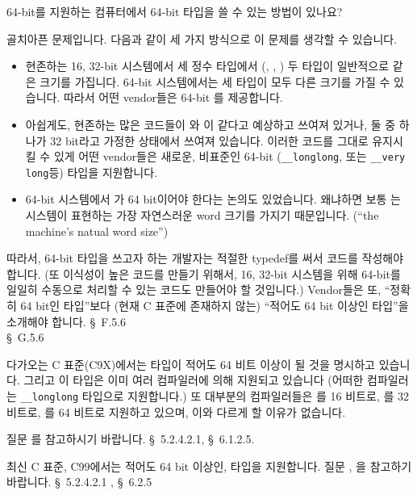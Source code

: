 	
\begin{faq}
	64-bit를 지원하는 컴퓨터에서 64-bit 타입을 쓸 수 있는 방법이 있나요?

\A	
        골치아픈 문제입니다. 다음과 같이 세 가지 방식으로 이 문제를
        생각할 수 있습니다.

        \begin{itemize}
          \item 현존하는 16, 32-bit 시스템에서 세 정수 타입에서
            (, , ) 두 타입이 일반적으로
            같은 크기를 가집니다. 64-bit 시스템에서는 세 타입이 모두
            다른 크기를 가질 수 있습니다. 따라서 어떤 vendor들은
            64-bit 를 제공합니다.

          \item 아쉽게도, 현존하는 많은 코드들이 와 이
            같다고 예상하고 쓰여져 있거나, 둘 중 하나가 32 bit라고 가정한
            상태에서 쓰여져 있습니다. 이러한 코드를 그대로 유지시킬 수
            있게 어떤 vendor들은 새로운, 비표준인 64-bit 
            (\verb+__longlong+, 또는 \verb+__very long+등) 타입을
            지원합니다.

          \item 64-bit 시스템에서 가 64 bit이어야 한다는
            논의도 있었습니다. 왜냐하면 보통 는 시스템이
            표현하는 가장 자연스러운 word 크기를 가지기 때문입니다.
            (``the machine's natual word size'')
        \end{itemize}

        따라서, 64-bit 타입을 쓰고자 하는 개발자는 적절한 typedef를 써서
        코드를 작성해야 합니다. (또 이식성이 높은 코드를 만들기 위해서,
        16, 32-bit 시스템을 위해 64-bit를 일일히 수동으로 처리할 수 있는
        코드도 만들어야 할 것입니다.)  Vendor들은 또, ``정확히 64 bit인
        타입''보다 (현재 C 표준에 존재하지 않는) 
        ``적어도 64 bit 이상인 타입''을 소개해야 합니다.
\T
	\cite{ansi} \S\ F.5.6 \\
        \cite{c89} \S\ G.5.6

\A
	다가오는 C 표준(C9X)에서는  타입이 적어도 64 비트
	이상이 될 것을 명시하고 있습니다.  그리고 이 타입은 이미 여러 
	컴파일러에 의해 지원되고 있습니다 (어떠한 컴파일러는 
	\verb+__longlong+ 타입으로 지원합니다.) 
	또 대부분의 컴파일러들은 를 16 비트로,
	를 32 비트로, 를 64 비트로 지원하고 있으며,
	이와 다르게 할 이유가 없습니다.

	질문 를 참고하시기 바랍니다.
\R 
	\cite{c9x} \S\ 5.2.4.2.1, \S\ 6.1.2.5.

\T
	최신 C 표준, C99에서는 적어도 64 bit 이상인,  타입을 
        지원합니다. 질문 , 을 참고하기 바랍니다.
\R
	\cite{c99} \S\ 5.2.4.2.1 , \S\ 6.2.5
\end{faq}

